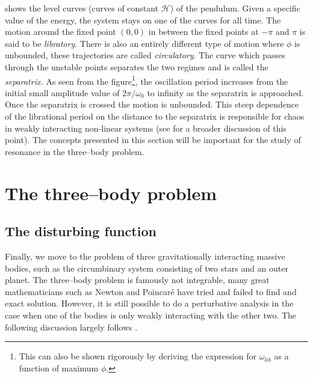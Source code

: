 \documentclass[twoside,openright,titlepage,numbers=noenddot,headinclude,%
                footinclude=true,cleardoublepage=empty,abstractoff, 
                BCOR=5mm,paper=a4,fontsize=11pt,%
                american,%
                ]{scrreprt}%
\begin{document}
 shows the level curves (curves of constant $\mathcal{H}$)
of the pendulum. Given a specific value of the energy, the system stays 
on one of the curves for all time. The motion around the fixed point $(0,0)$
 in between the fixed points at $-\pi$ and $\pi$ is said to be \emph{libratory}.
There is also an entirely different type of motion where $\phi$ is unbounded,
these trajectories are called \emph{circulatory}. The curve which passes through
the unstable points separates the two regimes and is called the \emph{separatrix.} 
As seen from the figure\footnote{This can also be shown rigorously by deriving the
expression for $\omega_{lib}$ as a function of maximum $\phi$.},
the oscillation period increases from the initial
small amplitude value of $2\pi/\omega_0$ to infinity as the separatrix is
approached. Once the separatrix is crossed the motion is unbounded. This
steep dependence of the librational period on the distance to the separatrix is
responsible for chaos in weakly interacting non-linear systems (see
\citet{cambridgenbody} for a broader discussion of this point). The concepts
presented in this section will be important for the study of resonance in the
three--body problem.

\section{The three--body problem}
\label{sec:three_body}
\subsection{The disturbing function}
Finally, we move to the problem of three gravitationally interacting massive 
bodies, such as the circumbinary system consisting of two stars and 
an outer planet. The three--body problem is famously not integrable, many 
great mathematicians such as Newton and Poincaré have tried and failed to find and
exact solution. However, it is still possible to do a perturbative analysis
in the case when one of the bodies is only weakly interacting with the
other two. The following discussion largely follows .
\end{document}
